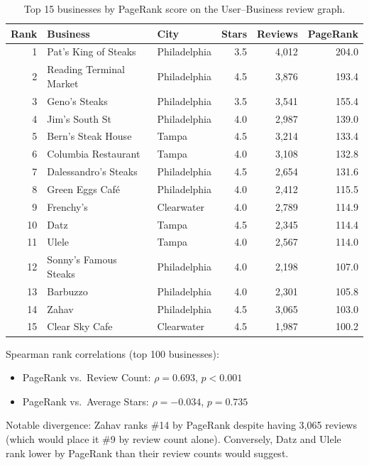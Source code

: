 \documentclass[11pt]{article}
\begin{document}
\begin{table}[H]
\centering
\small
\caption{Top 15 businesses by PageRank score on the User--Business review graph.}
\label{tab:gds-q1}
\begin{tabular}{r l l r r r}
\toprule
\rowcolor{SoftGray}
\textbf{Rank} & \textbf{Business} & \textbf{City} & \textbf{Stars} & \textbf{Reviews} & \textbf{PageRank} \\
\midrule
1 & Pat's King of Steaks & Philadelphia & 3.5 & 4,012 & 204.0 \\
2 & Reading Terminal Market & Philadelphia & 4.5 & 3,876 & 193.4 \\
3 & Geno's Steaks & Philadelphia & 3.5 & 3,541 & 155.4 \\
4 & Jim's South St & Philadelphia & 4.0 & 2,987 & 139.0 \\
5 & Bern's Steak House & Tampa & 4.5 & 3,214 & 133.4 \\
6 & Columbia Restaurant & Tampa & 4.0 & 3,108 & 132.8 \\
7 & Dalessandro's Steaks & Philadelphia & 4.5 & 2,654 & 131.6 \\
8 & Green Eggs Caf\'{e} & Philadelphia & 4.0 & 2,412 & 115.5 \\
9 & Frenchy's & Clearwater & 4.0 & 2,789 & 114.9 \\
10 & Datz & Tampa & 4.5 & 2,345 & 114.4 \\
11 & Ulele & Tampa & 4.0 & 2,567 & 114.0 \\
12 & Sonny's Famous Steaks & Philadelphia & 4.0 & 2,198 & 107.0 \\
13 & Barbuzzo & Philadelphia & 4.0 & 2,301 & 105.8 \\
14 & Zahav & Philadelphia & 4.5 & 3,065 & 103.0 \\
15 & Clear Sky Cafe & Clearwater & 4.5 & 1,987 & 100.2 \\
\bottomrule
\end{tabular}
\end{table}

Spearman rank correlations (top 100 businesses):
\begin{itemize}
  \item PageRank vs.\ Review Count: $\rho = 0.693$, $p < 0.001$
  \item PageRank vs.\ Average Stars: $\rho = -0.034$, $p = 0.735$
\end{itemize}

Notable divergence: Zahav ranks \#14 by PageRank despite having 3,065 reviews (which would place it \#9 by review count alone). Conversely, Datz and Ulele rank lower by PageRank than their review counts would suggest.
\end{document}

